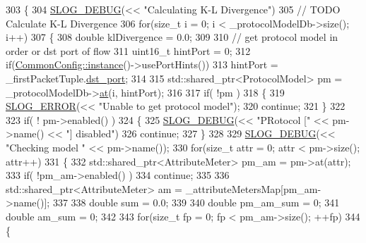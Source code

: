 \begin{DoxyCode}
303     \{
304         \hyperlink{_logger_8h_a1eb7292acb79b8ddab9851b3a9f7a4da}{SLOG\_DEBUG}(<< \textcolor{stringliteral}{"Calculating K-L Divergence"})
305         \textcolor{comment}{// TODO Calculate K-L Divergence}
306         for(\textcolor{keywordtype}{size\_t} i = 0; i < \_protocolModelDb->size(); i++)
307         \{
308             \textcolor{keywordtype}{double} klDivergence = 0.0;
309 
310             \textcolor{comment}{// get protocol model in order or dst port of flow}
311             uint16\_t hintPort = 0;
312             \textcolor{keywordflow}{if}(\hyperlink{class_vsid_common_1_1_common_config_a69c29458a786be527fe66470ac9fbbdb}{CommonConfig::instance}()->usePortHints())
313                 hintPort = \_firstPacketTuple.\hyperlink{class_vsid_common_1_1_i_pv4_tuple_a1c1d101406314b12ce43cc1d54177736}{dst\_port};
314 
315             std::shared\_ptr<ProtocolModel> pm = \_protocolModelDb->\hyperlink{class_vsid_1_1_protocol_model_db_a5bc72492cdde09f1bf753e0ebee26e9e}{at}(i, hintPort);
316 
317             \textcolor{keywordflow}{if}( !pm )
318             \{
319                 \hyperlink{_logger_8h_a2a8694cd392d18f4db6b9cc9f15bafe3}{SLOG\_ERROR}(<< \textcolor{stringliteral}{"Unable to get protocol model"});
320                 \textcolor{keywordflow}{continue};
321             \}
322 
323             \textcolor{keywordflow}{if}( ! pm->enabled() )
324             \{
325                 \hyperlink{_logger_8h_a1eb7292acb79b8ddab9851b3a9f7a4da}{SLOG\_DEBUG}(<< \textcolor{stringliteral}{"PRotocol ["} << pm->name() << \textcolor{stringliteral}{"] disabled"})
326                 \textcolor{keywordflow}{continue};
327             \}
328 
329             \hyperlink{_logger_8h_a1eb7292acb79b8ddab9851b3a9f7a4da}{SLOG\_DEBUG}(<< \textcolor{stringliteral}{"Checking model "} << pm->name());
330             \textcolor{keywordflow}{for}(\textcolor{keywordtype}{size\_t} attr = 0; attr < pm->size(); attr++)
331             \{
332                 std::shared\_ptr<AttributeMeter> pm\_am = pm->at(attr);
333                 \textcolor{keywordflow}{if}( !pm\_am->enabled() )
334                     \textcolor{keywordflow}{continue};
335 
336                 std::shared\_ptr<AttributeMeter> am = \_attributeMetersMap[pm\_am->name()];
337 
338                 \textcolor{keywordtype}{double} sum = 0.0;
339 
340                 \textcolor{keywordtype}{double} pm\_am\_sum = 0;
341                 \textcolor{keywordtype}{double} am\_sum = 0;
342 
343                 \textcolor{keywordflow}{for}(\textcolor{keywordtype}{size\_t} fp = 0; fp < pm\_am->size(); ++fp)
344                 \{

\end{DoxyCode}
